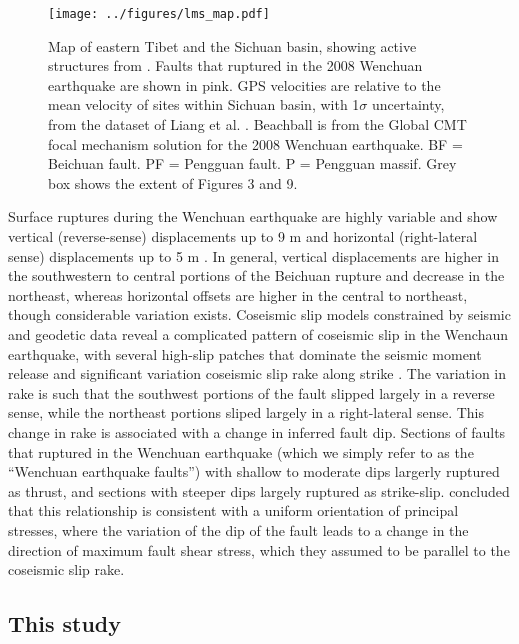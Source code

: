 \documentclass[twocolumn,jgrga]{AGUTeX}
\begin{document}
\begin{article}
\begin{figure}[ht!]
\texttt{[image: ../figures/lms\_map.pdf]}
\caption{Map of eastern Tibet and the Sichuan basin, showing active
structures from \citet{styron2010}. Faults that ruptured
in the 2008 Wenchuan earthquake are shown in pink. GPS velocities are
relative to the mean velocity of sites within Sichuan basin, with
1$\sigma$ uncertainty, from the dataset of Liang et al.
\citet{liang2013}. Beachball is from the Global CMT focal mechanism
solution for the 2008 Wenchuan earthquake. BF = Beichuan fault. PF =
Pengguan fault. P = Pengguan massif. Grey box shows the extent of
Figures 3 and 9.}
\label{fig:lms_map}
\end{figure}

Surface ruptures during the Wenchuan earthquake are highly variable and
show vertical (reverse-sense) displacements up to 9 m and horizontal
(right-lateral sense) displacements up to 5 m \citep{lin2009, liu2009,
xu2009}. In general, vertical displacements are higher in the
southwestern to central portions of the Beichuan rupture and decrease in
the northeast, whereas horizontal offsets are higher in the central to
northeast, though considerable variation exists. Coseismic slip models
constrained by seismic and geodetic data reveal a complicated pattern of
coseismic slip in the Wenchaun earthquake, with several high-slip
patches that dominate the seismic moment release and significant
variation coseismic slip rake along strike \citep[e.g.,][]{nakamura2010,
shen2009, tong2010, feng2010, zhang2011, qi2011, fielding2013}.
The variation in rake is such that the southwest portions of the fault
slipped largely in a reverse sense, while the northeast portions sliped
largely in a right-lateral sense. This change in rake is associated with
a change in inferred fault dip. Sections of faults that ruptured in the
Wenchuan earthquake (which we simply refer to as the ``Wenchuan
earthquake faults'') with shallow to moderate dips largerly ruptured as
thrust, and sections with steeper dips largely ruptured as strike-slip.
\citet{medinaluna2013} concluded that this
relationship is consistent with a uniform orientation of principal
stresses, where the variation of the dip of the fault leads to a change
in the direction of maximum fault shear stress, which they assumed to be
parallel to the coseismic slip rake.

\subsection{This study}\label{this-study}


\end{article}
\end{document}
